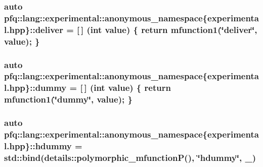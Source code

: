 \hypertarget{namespacepfq_1_1lang_1_1experimental_1_1anonymous__namespace_02experimental_8hpp_03_aabd600ebf1ee62184fa0765f49f9f990}{
\subsubsection[{deliver}]{\setlength{\rightskip}{0pt plus 5cm}auto pfq\+::lang\+::experimental\+::anonymous\+\_\+namespace\{experimental.\+hpp\}\+::deliver = \mbox{[}$\,$\mbox{]} (int value) \{ return {\bf mfunction1}(\char`\"{}deliver\char`\"{}, value); \}}}\label{namespacepfq_1_1lang_1_1experimental_1_1anonymous__namespace_02experimental_8hpp_03_aabd600ebf1ee62184fa0765f49f9f990}
\hypertarget{namespacepfq_1_1lang_1_1experimental_1_1anonymous__namespace_02experimental_8hpp_03_a5fc8274e9598b8524f833264174b62b7}{
\subsubsection[{dummy}]{\setlength{\rightskip}{0pt plus 5cm}auto pfq\+::lang\+::experimental\+::anonymous\+\_\+namespace\{experimental.\+hpp\}\+::dummy = \mbox{[}$\,$\mbox{]} (int value) \{ return {\bf mfunction1}(\char`\"{}dummy\char`\"{}, value); \}}}\label{namespacepfq_1_1lang_1_1experimental_1_1anonymous__namespace_02experimental_8hpp_03_a5fc8274e9598b8524f833264174b62b7}
\hypertarget{namespacepfq_1_1lang_1_1experimental_1_1anonymous__namespace_02experimental_8hpp_03_a6377eeaace811b051eaf2edffd4968f9}{
\subsubsection[{hdummy}]{\setlength{\rightskip}{0pt plus 5cm}auto pfq\+::lang\+::experimental\+::anonymous\+\_\+namespace\{experimental.\+hpp\}\+::hdummy = std\+::bind(details\+::polymorphic\+\_\+mfunction\+P(), \char`\"{}hdummy\char`\"{}, \+\_)}}\label{namespacepfq_1_1lang_1_1experimental_1_1anonymous__namespace_02experimental_8hpp_03_a6377eeaace811b051eaf2edffd4968f9}
